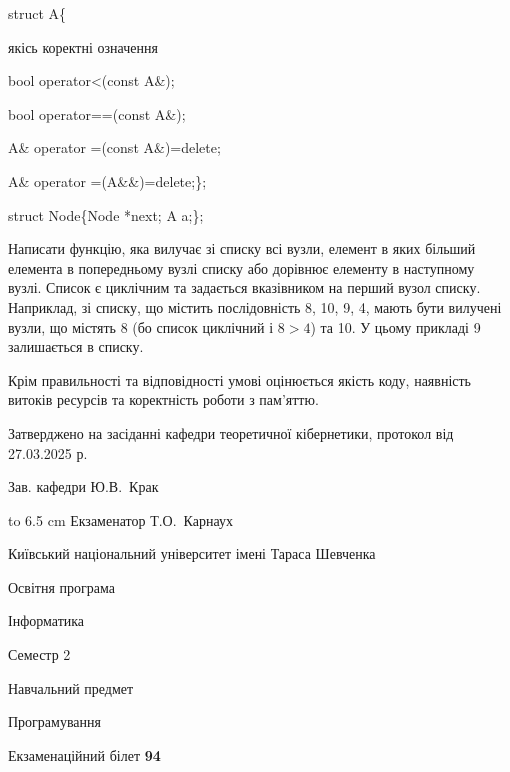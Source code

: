 \documentclass[12pt, ukrainian]{article}
\begin{document}
{struct A\{

\quad  якісь коректні означення 

\quad  bool operator<(const A\&); 

\quad  bool operator==(const A\&); 

\quad A\& operator =(const A\&)=delete; 

\quad  A\& operator =(A\&\&)=delete;\};

struct Node\{Node *next; A a;\};

 Написати функцію, яка вилучає зі списку всі вузли, елемент в яких більший елемента в попередньому вузлі списку або дорівнює елементу в наступному вузлі. Список є циклічним та задається вказівником на перший вузол списку. Наприклад, зі списку, що містить послідовність 8, 10, 9, 4, мають бути вилучені вузли, що містять 8 (бо список циклічний і $8>4$) та 10. У цьому прикладі 9 залишається в списку.

Крім правильності та відповідності умові оцінюється якість коду, наявність витоків ресурсів та коректність роботи з пам'яттю. 

}
{\smallskip\smallskip \begin {scriptsize} Затверджено на засіданні кафедри теоретичної кібернетики, протокол   від   27.03.2025 р.\par\smallskip\smallskip\smallskip\smallskip
{\parbox {6.5 cm} {Зав. кафедри \dotfill Ю.В.~Крак}}\hspace {0.7cm} {\hbox to 6.5 cm { Екзаменатор \dotfill Т.О.~Карнаух}} \end{scriptsize}}
\newpage
{{\begin {scriptsize}\par
{ \center  Київський національний університет імені Тараса Шевченка \par}
{\parbox {5 cm}{Освітня програма \hfill}{\parbox {7 cm}{Інформатика\hfill}}\parbox {6 cm}{\hfill Семестр 2}}\par
{\parbox {5 cm} {Навчальний предмет \hfill}\parbox {7 cm}{Програмування \hfill}\parbox {6cm}{\hfill}\par}\vspace{-15pt} \end{scriptsize}}{\center Екзаменаційний білет \No \textbf { 94 }\par}}
\end{document}
